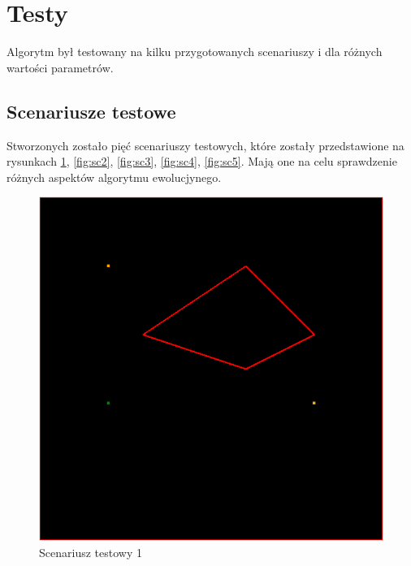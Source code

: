 \documentclass[11pt, leqno]{article}
\begin{document}
\section{Testy}

Algorytm był testowany na kilku przygotowanych scenariuszy i dla różnych wartości parametrów.

\subsection{Scenariusze testowe}
Stworzonych zostało pięć scenariuszy testowych, które zostały przedstawione na rysunkach \ref{fig:sc1}, \ref{fig:sc2}, \ref{fig:sc3}, \ref{fig:sc4}, \ref{fig:sc5}. Mają one na celu sprawdzenie różnych aspektów algorytmu ewolucjynego.


\begin{figure}[h!]
	\centering
	\includegraphics[scale=0.4]{scenario1}
	\caption{Scenariusz testowy 1}
	\label{fig:sc1}
\end{figure}
\end{document}

